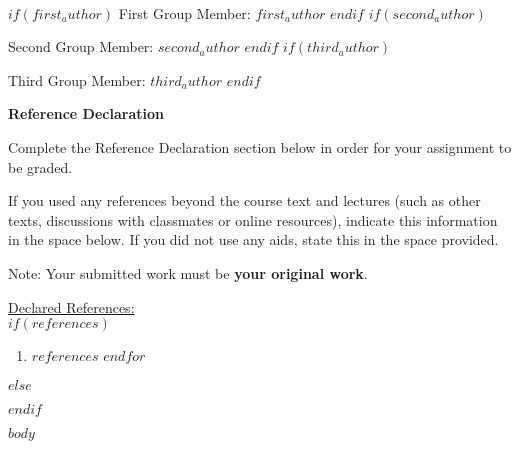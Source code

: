 \documentclass[12pt,oneside]{article}
\begin{document}
\noindent
{}

\vspace{0.015in}\hrulefill\ \\
$if(first_author)$
\large{First Group Member: $first_author$}
$endif$
$if(second_author)$
\par
\large{Second Group Member: $second_author$}
$endif$
$if(third_author)$
\par
\large{Third Group Member: $third_author$}
$endif$
\\

\normalsize


\textbf{Reference Declaration}

Complete the Reference Declaration section below in order for your assignment to be graded.

If you used any references beyond the course text and lectures (such as other texts, discussions with classmates or online resources), indicate this information in the space below.  If you did not use any aids, state this in the space provided. 

Note: Your submitted work must be \textbf{your original work}. 

\underline{Declared References:} \\

$if(references)$
\begin{enumerate}
$for(references)$
    \item $references$
$endfor$
\end{enumerate}
$else$
\par
$endif$

\newpage

$body$
\end{document}
